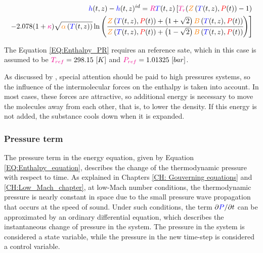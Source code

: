 \documentclass[../Article_Model_Parameters.tex]{subfiles}
\begin{document}
			{\scriptsize
				\begin{equation}
					\begin{split}
					{\color{blue}h}(t,z)-{\color{blue}h}(t,z)^{id}={\color{magenta}R}{\color{blue}T}(t,z) \left[{\color{magenta}T_r}({\color{orange}Z}\left({\color{blue}T}(t,z), {\color{red}P}(t)\right)-1) \right. \\
					\left. -2.078(1+{\color{magenta}\kappa} ){\sqrt { {\color{orange}\alpha}\left({\color{blue}T}(t,z)\right) } } \ln \left(\cfrac{{\color{orange}Z}\left({\color{blue}T}(t,z), {\color{red}P}(t)\right)+\left( 1+\sqrt{2} \right){\color{orange}B}\left({\color{blue}T}(t,z), {\color{red}P}(t)\right)}{{\color{orange}Z}\left({\color{blue}T}(t,z), {\color{red}P}(t)\right)+\left( 1-\sqrt{2} \right){\color{orange}B}\left({\color{blue}T}(t,z), {\color{red}P}(t)\right)}\right)\right]
					\label{EQ:Enthalpy_PR}
				\end{split}
			\end{equation}				
			}
		
			The Equation \ref{EQ:Enthalpy_PR} requires an reference sate, which in this case is assumed to be ${\color{magenta}T_{ref}}=298.15~[K]$ and ${\color{magenta}P_{ref}}=1.01325~[bar]$.
			
			As discussed by \citet{Gmehling2019}, special attention should be paid to high pressures systems, so the influence of the intermolecular forces on the enthalpy is taken into account. In most cases, these forces are attractive, so additional energy is necessary to move the molecules away from each other, that is, to lower the density. If this energy is not added, the substance cools down when it is expanded.
			
		\subsubsection{Pressure term} \label{CH: Pressure}
		
		The pressure term in the energy equation, given by Equation \ref{EQ:Enthalpy_equation}, describes the change of the thermodynamic pressure with respect to time. As explained in Chapters \ref{CH: Gouverning equations} and \ref{CH:Low_Mach_chapter}, at low-Mach number conditions, the thermodynamic pressure is nearly constant in space due to the small pressure wave propagation that occurs at the speed of sound. Under such conditions, the term $\partial {\color{blue}P}/\partial t$ can be approximated by an ordinary differential equation, which describes the instantaneous change of pressure in the system. The pressure in the system is considered a state variable, while the pressure in the new time-step is considered a control variable.
		
\end{document}
